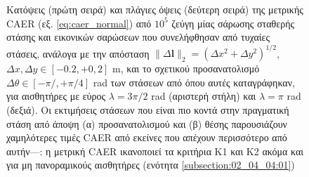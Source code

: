 \begin{figure}\centering
  
  \vspace{1cm}
  \caption{\small Κατόψεις (πρώτη σειρά) και πλάγιες όψεις
           (δεύτερη σειρά) της μετρικής CAER (εξ. \ref{eq:caer_normal}) από
           $10^5$ ζεύγη μίας σάρωσης σταθερής στάσης και εικονικών σαρώσεων που
           συνελήφθησαν από τυχαίες στάσεις, ανάλογα με την απόσταση $\|\Delta
           \bm{l}\|_2 = (\Delta x^2 + \Delta y^2)^{1/2}$, $\Delta x, \Delta y
           \in [-0.2, +0,2]$ m, και το σχετικού προσανατολισμό $\Delta \theta
           \in [-\pi/, +\pi/4]$ rad των στάσεων από όπου αυτές καταγράφηκαν,
           για αισθητήρες με εύρος $\lambda = 3\pi/2$ rad (αριστερή στήλη) και
           $\lambda = \pi$ rad (δεξιά). Οι εκτιμήσεις στάσεων που είναι πιο
           κοντά στην πραγματική στάση από άποψη (α) προσανατολισμού και (β)
           θέσης παρουσιάζουν χαμηλότερες τιμές CAER από εκείνες που απέχουν
           περισσότερο από αυτήν---: η μετρική CAER ικανοποιεί τα κριτήρια Κ1
           και Κ2 ακόμα και για μη πανοραμικούς
           αισθητήρες (ενότητα \ref{subsection:02_04_04:01})}
  \label{fig:03_02_01:caer}
\end{figure}

